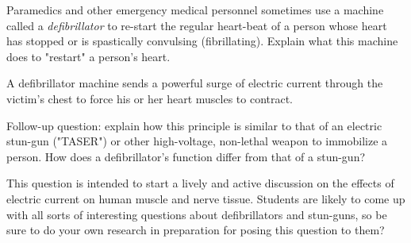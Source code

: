 

Paramedics and other emergency medical personnel sometimes use a machine called a {\it defibrillator} to re-start the regular heart-beat of a person whose heart has stopped or is spastically convulsing (fibrillating).  Explain what this machine does to "restart" a person's heart.







A defibrillator machine sends a powerful surge of electric current through the victim's chest to force his or her heart muscles to contract.

\vskip 10pt

Follow-up question: explain how this principle is similar to that of an electric stun-gun ("TASER") or other high-voltage, non-lethal weapon to immobilize a person.  How does a defibrillator's function differ from that of a stun-gun?







This question is intended to start a lively and active discussion on the effects of electric current on human muscle and nerve tissue.  Students are likely to come up with all sorts of interesting questions about defibrillators and stun-guns, so be sure to do your own research in preparation for posing this question to them?




